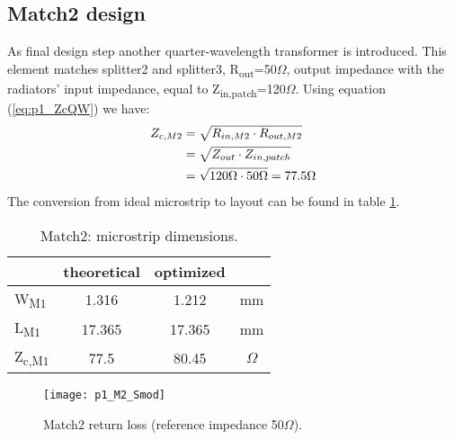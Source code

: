 \subsection{Match2 design}

As final design step another quarter-wavelength transformer is introduced. This element matches splitter2 and splitter3, R\textsubscript{out}=50$\Omega$, output impedance with the radiators' input impedance, equal to Z\textsubscript{in,patch}=120$\Omega$. Using equation (\ref{eq:p1_ZcQW}) we have:
\begin{align}
	Z_{c,M2}&=\sqrt{R_{in,M2}\cdot R_{out,M2}} \notag\\
	&=\sqrt{Z_{out}\cdot Z_{in,patch}} \notag\\
	&=\sqrt{120\Omega \cdot 50\Omega}=77.5\Omega \notag
\end{align}
The conversion from ideal microstrip to layout can be found in table \ref{tab:21_DimM2}.

\begin{table} [h]
	\label{tab:21_DimM2}
	\caption{Match2: microstrip dimensions.}
	\centering	
	\begin{tabular}{lccc} 
		\toprule
		& theoretical 			& optimized &\\
		\midrule 
		W\textsubscript{M1} 	&	1.316		&	1.212	& mm 		\\
		L\textsubscript{M1}		&	17.365		& 	17.365	& mm		\\ 
		Z\textsubscript{c,M1}	&	77.5		& 	80.45	& $\Omega$		\\
		\bottomrule
	\end{tabular}	
\end{table}

\begin{figure}[t] 
	\centering
	\texttt{[image: p1\_M2\_Smod]}
	\caption{Match2 return loss (reference impedance 50$\Omega$). }
	\label{fig:e1_array}
\end{figure}